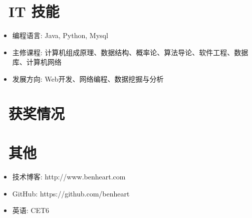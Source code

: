 \documentclass{resume}
\begin{document}
\section{\faCogs\ IT 技能}
\begin{itemize}[parsep=0.5ex]
  \item 编程语言: Java, Python, Mysql
  \item 主修课程: 计算机组成原理、数据结构、概率论、算法导论、软件工程、数据库、计算机网络
  \item 发展方向: Web开发、网络编程、数据挖掘与分析
\end{itemize}

\section{\faTrophy\ 获奖情况}

\section{\faInfo\ 其他}
\begin{itemize}[parsep=0.5ex]
  \item 技术博客: http://www.benheart.com
  \item GitHub: https://github.com/benheart
  \item 英语: CET6
\end{itemize}

%
%
\end{document}
